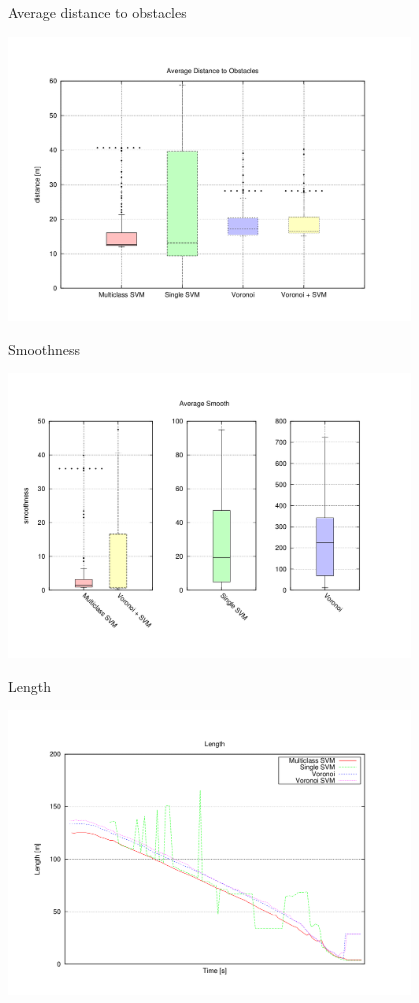 \begin{frame}{Average distance to obstacles}
  \begin{center}
    \includegraphics[width=0.8\textwidth,trim=55 50 85 60, clip]{figure11}
  \end{center}
\end{frame}

\begin{frame}{Smoothness}
  \begin{center}
    \includegraphics[width=0.8\textwidth,trim=55 50 85 60, clip]{figure12}
  \end{center}
\end{frame}

\begin{frame}{Length}
  \begin{center}
    \includegraphics[width=0.8\textwidth,trim=55 45 85 60, clip]{figure13}
  \end{center}
\end{frame}

